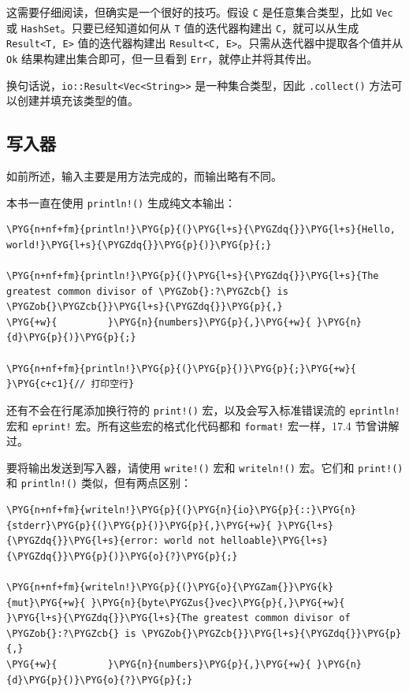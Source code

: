 这需要仔细阅读，但确实是一个很好的技巧。假设 \texttt{C} 是任意集合类型，比如 \texttt{Vec} 或 \texttt{HashSet}。只要已经知道如何从 \texttt{T} 值的迭代器构建出 \texttt{C}，就可以从生成 \texttt{Result<T, E>} 值的迭代器构建出 \texttt{Result<C, E>}。只需从迭代器中提取各个值并从 \texttt{Ok} 结果构建出集合即可，但一旦看到 \texttt{Err}，就停止并将其传出。

换句话说，\texttt{io::Result<Vec<String>>} 是一种集合类型，因此 \texttt{.collect()} 方法可以创建并填充该类型的值。

\subsection{写入器}

如前所述，输入主要是用方法完成的，而输出略有不同。

本书一直在使用 \texttt{println!()} 生成纯文本输出：

\begin{Verbatim}[commandchars=\\\{\},breaklines=true,breakanywhere=true,fontsize=\codefont,xleftmargin=17bp]
\PYG{n+nf+fm}{println!}\PYG{p}{(}\PYG{l+s}{\PYGZdq{}}\PYG{l+s}{Hello, world!}\PYG{l+s}{\PYGZdq{}}\PYG{p}{)}\PYG{p}{;}

\PYG{n+nf+fm}{println!}\PYG{p}{(}\PYG{l+s}{\PYGZdq{}}\PYG{l+s}{The greatest common divisor of \PYGZob{}:?\PYGZcb{} is \PYGZob{}\PYGZcb{}}\PYG{l+s}{\PYGZdq{}}\PYG{p}{,}
\PYG{+w}{         }\PYG{n}{numbers}\PYG{p}{,}\PYG{+w}{ }\PYG{n}{d}\PYG{p}{)}\PYG{p}{;}

\PYG{n+nf+fm}{println!}\PYG{p}{(}\PYG{p}{)}\PYG{p}{;}\PYG{+w}{  }\PYG{c+c1}{// 打印空行}
\end{Verbatim}

还有不会在行尾添加换行符的 \texttt{print!()} 宏，以及会写入标准错误流的 \texttt{eprintln!} 宏和 \texttt{eprint!} 宏。所有这些宏的格式化代码都和 \texttt{format!} 宏一样，17.4 节曾讲解过。

要将输出发送到写入器，请使用 \texttt{write!()} 宏和 \texttt{writeln!()} 宏。它们和 \texttt{print!()} 和 \texttt{println!()} 类似，但有两点区别：

\begin{Verbatim}[commandchars=\\\{\},breaklines=true,breakanywhere=true,fontsize=\codefont,xleftmargin=17bp]
\PYG{n+nf+fm}{writeln!}\PYG{p}{(}\PYG{n}{io}\PYG{p}{::}\PYG{n}{stderr}\PYG{p}{(}\PYG{p}{)}\PYG{p}{,}\PYG{+w}{ }\PYG{l+s}{\PYGZdq{}}\PYG{l+s}{error: world not helloable}\PYG{l+s}{\PYGZdq{}}\PYG{p}{)}\PYG{o}{?}\PYG{p}{;}

\PYG{n+nf+fm}{writeln!}\PYG{p}{(}\PYG{o}{\PYGZam{}}\PYG{k}{mut}\PYG{+w}{ }\PYG{n}{byte\PYGZus{}vec}\PYG{p}{,}\PYG{+w}{ }\PYG{l+s}{\PYGZdq{}}\PYG{l+s}{The greatest common divisor of \PYGZob{}:?\PYGZcb{} is \PYGZob{}\PYGZcb{}}\PYG{l+s}{\PYGZdq{}}\PYG{p}{,}
\PYG{+w}{         }\PYG{n}{numbers}\PYG{p}{,}\PYG{+w}{ }\PYG{n}{d}\PYG{p}{)}\PYG{o}{?}\PYG{p}{;}
\end{Verbatim}

